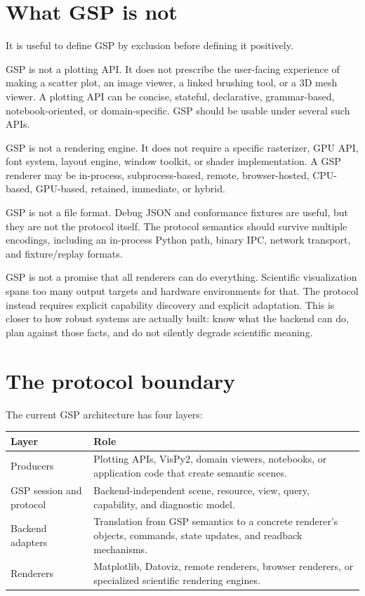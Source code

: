 \documentclass[a4paper,11pt]{article}
\newcommand{\gsp}{GSP\xspace}
\newcommand{\vispytwo}{VisPy2\xspace}
\newcommand{\datoviz}{Datoviz\xspace}
\newcommand{\matplotlib}{Matplotlib\xspace}
\begin{document}
\section{What \gsp is not}

It is useful to define \gsp by exclusion before defining it positively.

\gsp is not a plotting API. It does not prescribe the user-facing experience of making a scatter
plot, an image viewer, a linked brushing tool, or a 3D mesh viewer. A plotting API can be concise,
stateful, declarative, grammar-based, notebook-oriented, or domain-specific. \gsp should be usable
under several such APIs.

\gsp is not a rendering engine. It does not require a specific rasterizer, GPU API, font system,
layout engine, window toolkit, or shader implementation. A \gsp renderer may be in-process,
subprocess-based, remote, browser-hosted, CPU-based, GPU-based, retained, immediate, or hybrid.

\gsp is not a file format. Debug JSON and conformance fixtures are useful, but they are not the
protocol itself. The protocol semantics should survive multiple encodings, including an in-process
Python path, binary IPC, network transport, and fixture/replay formats.

\gsp is not a promise that all renderers can do everything. Scientific visualization spans too many
output targets and hardware environments for that. The protocol instead requires explicit
capability discovery and explicit adaptation. This is closer to how robust systems are actually
built: know what the backend can do, plan against those facts, and do not silently degrade
scientific meaning.

\section{The protocol boundary}

The current \gsp architecture has four layers:

\begin{center}
\begin{tabularx}{0.92\textwidth}{@{}lX@{}}
\toprule
Layer & Role \\
\midrule
Producers & Plotting APIs, \vispytwo, domain viewers, notebooks, or application code that create
semantic scenes. \\
\gsp session and protocol & Backend-independent scene, resource, view, query, capability, and
diagnostic model. \\
Backend adapters & Translation from \gsp semantics to a concrete renderer's objects, commands,
state updates, and readback mechanisms. \\
Renderers & \matplotlib, \datoviz, remote renderers, browser renderers, or specialized scientific
rendering engines. \\
\bottomrule
\end{tabularx}
\end{center}
\end{document}
